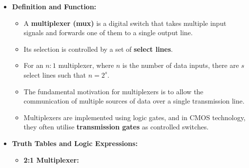 \documentclass{article}
\begin{document}
\begin{itemize}
\begin{itemize}
    \item \textbf{Definition and Function:}
    \begin{itemize}
        \item A \textbf{multiplexer (mux)} is a digital switch that takes multiple input signals and forwards one of them to a single output line.
        \item Its selection is controlled by a set of \textbf{select lines}.
        \item For an $n:1$ multiplexer, where $n$ is the number of data inputs, there are $s$ select lines such that $n = 2^s$.
        \item The fundamental motivation for multiplexers is to allow the communication of multiple sources of data over a single transmission line.
        \item Multiplexers are implemented using logic gates, and in CMOS technology, they often utilise \textbf{transmission gates} as controlled switches.
    \end{itemize}
    \item \textbf{Truth Tables and Logic Expressions:}
    \begin{itemize}
        \item \textbf{2:1 Multiplexer:}
\end{itemize}
\end{itemize}
\end{itemize}
\end{document}
